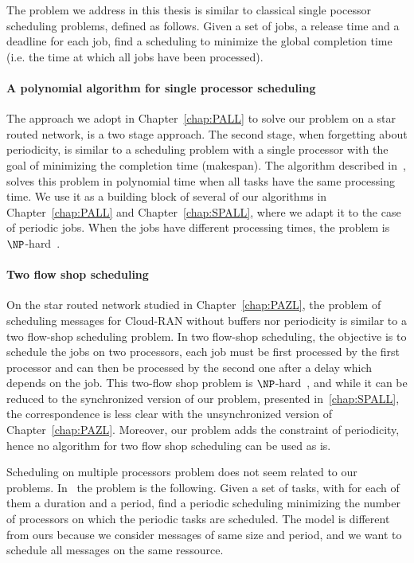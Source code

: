 
The problem we address in this thesis is similar to classical single pocessor scheduling problems, defined as follows. Given a set of jobs, a release time and a deadline for each job, find a scheduling to minimize the global completion time (i.e. the time at which all jobs have been processed).

\paragraph{A polynomial algorithm for single processor scheduling}
The approach we adopt in Chapter~\ref{chap:PALL} to solve our problem on a star routed network, is a two stage approach. The second stage, when forgetting about periodicity, is similar to a scheduling problem with a single processor with the goal of minimizing the completion time (makespan). The algorithm described in~\cite{simons1978fast}, solves this problem in polynomial time when all tasks have the same processing time. We use it as a building block of several of our algorithms in Chapter~\ref{chap:PALL} and Chapter~\ref{chap:SPALL}, where we adapt it to the case of periodic jobs. When the jobs have different processing times, the problem is $\NP$-hard~\cite{lenstra1977complexity}.

\paragraph{Two flow shop scheduling}
 On the star routed network studied in Chapter~\ref{chap:PAZL}, the problem of scheduling messages for Cloud-RAN without buffers nor periodicity is similar to a two flow-shop scheduling problem. In two flow-shop scheduling, the objective is to schedule the jobs on two processors, each job must be first processed by the first processor and can then be processed by the second one after a delay which depends on the job. This two-flow shop problem is $\NP$-hard~\cite{yu2004minimizing}, and while it can be reduced to the synchronized version of our problem, presented in~\ref{chap:SPALL}, the correspondence is less clear with the unsynchronized version of Chapter~\ref{chap:PAZL}. Moreover, our problem adds the constraint of periodicity, hence no algorithm for two flow shop scheduling can be used as is.

Scheduling on multiple processors problem does not seem related to our problems. In~\cite{korst1991periodic} the problem is the following. Given a set of tasks, with for each of them a duration and a period, find a periodic scheduling minimizing the number of processors on which the periodic tasks are scheduled. The model is different from ours because we consider messages of same size and period, and we want to schedule all messages on the same ressource.

